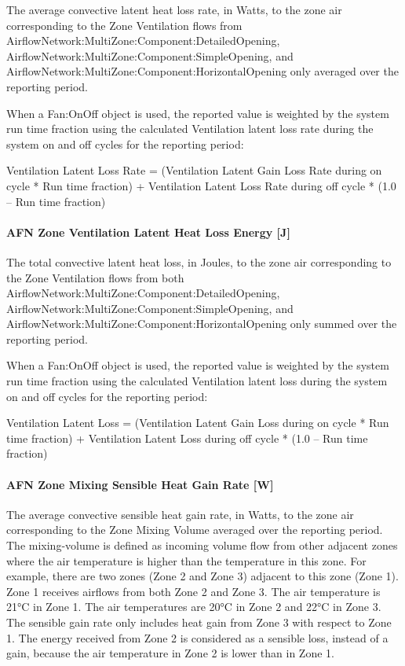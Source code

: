 The average convective latent heat loss rate, in Watts, to the zone air corresponding to the Zone Ventilation flows from AirflowNetwork:MultiZone:Component:DetailedOpening, AirflowNetwork:MultiZone:Component:SimpleOpening, and AirflowNetwork:MultiZone:Component:HorizontalOpening only  averaged over the reporting period.

When a Fan:OnOff object is used, the reported value is weighted by the system run time fraction using the calculated Ventilation latent loss rate during the system on and off cycles for the reporting period:

Ventilation Latent Loss Rate = (Ventilation Latent Gain Loss Rate during on cycle * Run time fraction) + Ventilation Latent Loss Rate during off cycle * (1.0 -- Run time fraction)

\paragraph{AFN Zone Ventilation Latent Heat Loss Energy {[}J{]}}\label{afn-zone-ventilation-latent-heat-loss-energy-j}

The total convective latent heat loss, in Joules, to the zone air corresponding to the Zone Ventilation flows from both AirflowNetwork:MultiZone:Component:DetailedOpening, AirflowNetwork:MultiZone:Component:SimpleOpening, and AirflowNetwork:MultiZone:Component:HorizontalOpening only  summed over the reporting period.

When a Fan:OnOff object is used, the reported value is weighted by the system run time fraction using the calculated Ventilation latent loss during the system on and off cycles for the reporting period:

Ventilation Latent Loss = (Ventilation Latent Gain Loss during on cycle * Run time fraction) + Ventilation Latent Loss during off cycle * (1.0 -- Run time fraction)

\paragraph{AFN Zone Mixing Sensible Heat Gain Rate {[}W{]}}\label{afn-zone-mixing-sensible-heat-gain-rate-w}

The average convective sensible heat gain rate, in Watts, to the zone air corresponding to the Zone Mixing Volume averaged over the reporting period. The mixing-volume is defined as incoming volume flow from other adjacent zones where the air temperature is higher than the temperature in this zone. For example, there are two zones (Zone 2 and Zone 3) adjacent to this zone (Zone 1). Zone 1 receives airflows from both Zone 2 and Zone 3. The air temperature is 21°C in Zone 1. The air temperatures are 20°C in Zone 2 and 22°C in Zone 3. The sensible gain rate only includes heat gain from Zone 3 with respect to Zone 1. The energy received from Zone 2 is considered as a sensible loss, instead of a gain, because the air temperature in Zone 2 is lower than in Zone 1.

